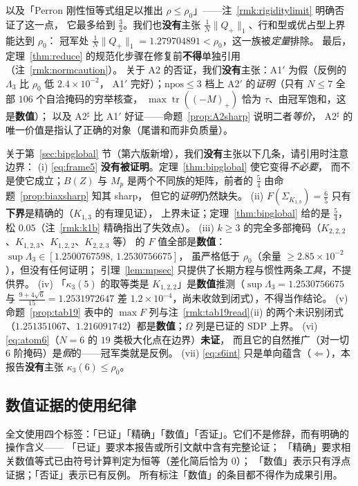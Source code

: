 \documentclass[UTF8,11pt]{ctexart}
\theoremstyle{definition}
\newcommand{\Lam}{\Lambda}
\newcommand{\tr}{\operatorname{tr}}
\begin{document}
以及「Perron 刚性恒等式组足以推出 $\rho\le\rho_0$」——注~\ref{rmk:rigiditylimit} 明确否证了这一点，
它最多给到 $\frac32$。我们也\textbf{没有}主张 $\frac1N\|Q_+\|_1$、行和型或优占型上界能达到 $\rho_0$：
冠军处 $\frac1N\|Q_+\|_1=1.279704891<\rho_0$，这一族被\emph{定量}排除。
最后，定理~\ref{thm:reduce} 的规范化步骤在修复前\textbf{不得}单独引用（注~\ref{rmk:normcaution}）。
关于 A2 的否证，我们\textbf{没有}主张：A1$'$ 为假（反例的 $\Lam_3$ 比 $\rho_0$ 低 $2.4\times10^{-2}$，
A1$'$ 完好）；$\mathrm{npos}\le3$ 档上 A2$'$ 的\emph{证明}（只有 $N\le7$ 全部 $106$ 个自洽掩码的穷举核查，
$\max\tr((-M)_+)$ 恰为 $\tau$、由冠军饱和，这是\textbf{数值}）；
以及 A2$^\sharp$ 比 A1$'$ 好证——命题~\ref{prop:A2sharp} 说明二者\emph{等价}，
A2$^\sharp$ 的唯一价值是指认了正确的对象（尾谱和而非负质量）。

关于第~\ref{sec:bipglobal} 节（第六版新增），我们\textbf{没有}主张以下几条，请引用时注意边界：
(i) \eqref{eq:frame5} \textbf{没有被证明}。定理~\ref{thm:bipglobal} 使它变得\emph{不必要}，
而不是使它成立；$B(Z)$ 与 $M_p$ 是两个不同族的矩阵，前者的 $\frac54$ 由命题~\ref{prop:biaxsharp} 知其 sharp，
但它的\emph{证明}仍然缺失。
(ii) $F(\Sigma_{K_{1,b}})=\frac65$ 只有\textbf{下界}是精确的（$K_{1,3}$ 的有理见证），
上界未证；定理~\ref{thm:bipglobal} 给的是 $\frac54$，松 $0.05$（注~\ref{rmk:k1b} 精确指出了失效点）。
(iii) $k\ge3$ 的完全多部掩码（$K_{2,2,2}$、$K_{1,2,3}$、$K_{1,2,2}$、$K_{2,2,3}$ 等）
的 $F$ 值全部是\textbf{数值}：$\sup\Lam_3\in[1.2500767598,\,1.2530756675]$，
虽严格低于 $\rho_0$（余量 $\ge2.85\times10^{-2}$），但没有任何证明；
引理~\ref{lem:mpsec} 只提供了长期方程与惯性两条\emph{工具}，不提供界。
(iv) 「$\kappa_3(5)$ 的取等类是 $K_{1,2,2}$」是\textbf{数值}推测（$\sup\Lam_3=1.2530756675$
与 $\frac{9+4\sqrt6}{15}=1.2531972647$ 差 $1.2\times10^{-4}$，尚未收敛到闭式），不得当作结论。
(v) 命题~\ref{prop:tab19} 表中的 $\max F$ 列与注~\ref{rmk:tab19read}(ii) 的两个未识别闭式
（$1.251351067$、$1.216091742$）都是\textbf{数值}；$\Omega$ 列是已证的 SDP 上界。
(vi) \eqref{eq:atom6}（$N=6$ 的 $19$ 类极大化点在边界）\textbf{未证}，
而且它的自然推广（对一切 $6$ 阶掩码）是\emph{假}的——冠军类就是反例。
(vii) \eqref{eq:s6int} 只是单向蕴含（$\Leftarrow$），本报告\textbf{没有}主张 $\kappa_3(6)\le\rho_0$。

\subsection{数值证据的使用纪律}

全文使用四个标签：「已证」「精确」「数值」「否证」。它们不是修辞，而有明确的操作含义——
「已证」要求本报告或所引文献中含有完整论证；
「精确」要求相关数值等式已由符号计算判定为恒等（差化简后恰为 $0$）；
「数值」表示只有浮点证据；「否证」表示已有反例。
所有标注「数值」的条目都不得作为成果引用。
\end{document}
